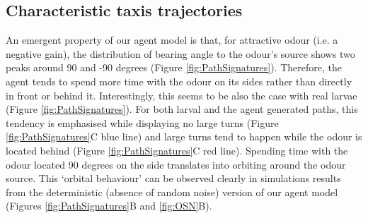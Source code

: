 \documentclass[11pt,a4paper]{article}
\begin{document}
\subsection{Characteristic taxis trajectories}
An emergent property of our agent model is that, for attractive odour (i.e. a negative gain), the distribution of bearing angle to the odour's source shows two peaks around 90 and -90 degrees (Figure \ref{fig:PathSignatures}). Therefore, the agent tends to spend more time with the odour on its sides rather than directly in front or behind it. Interestingly, this seems to be also the case with real larvae (Figure \ref{fig:PathSignatures}). For both  larval and the agent generated paths, this tendency is emphasised while displaying no large turns (Figure \ref{fig:PathSignatures}C blue line) and large turns tend to happen while the odour is located behind (Figure \ref{fig:PathSignatures}C red line). Spending time with the odour located 90 degrees on the side translates into orbiting around the odour source. This ‘orbital behaviour’ can be observed clearly in simulations results from the deterministic (absence of random noise) version of our agent model (Figures \ref{fig:PathSignatures}B and \ref{fig:OSN}B).
\end{document}
